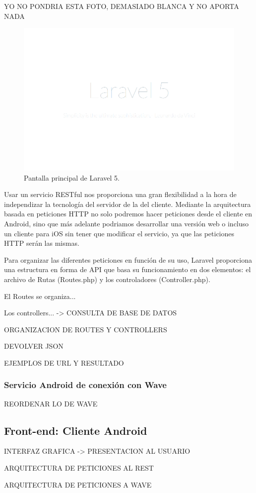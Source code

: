 YO NO PONDRIA ESTA FOTO, DEMASIADO BLANCA Y NO APORTA NADA 

\begin{figure}[H]
\centering
\includegraphics[keepaspectratio, scale=0.30]{Media/Captures/laravel5.png}
\caption{Pantalla principal de Laravel 5.}
\label{fig:laravel5}
\end{figure}

Usar un servicio RESTful nos proporciona una gran flexibilidad a la hora de independizar la tecnología del servidor de la del cliente. Mediante la arquitectura basada en peticiones HTTP no solo podremos hacer peticiones desde el cliente en Android, sino que más adelante podriamos desarrollar una versión web o incluso un cliente para iOS sin tener que modificar el servicio, ya que las peticiones HTTP serán las mismas.

Para organizar las diferentes peticiones en función de su uso, Laravel proporciona una estructura en forma de API que basa su funcionamiento en dos elementos: el archivo de Rutas (Routes.php) y los controladores (Controller.php).

El Routes se organiza...

Los controllers... -> CONSULTA DE BASE DE DATOS

ORGANIZACION DE ROUTES Y CONTROLLERS

DEVOLVER JSON

EJEMPLOS DE URL Y RESULTADO

\subsubsection{Servicio Android de conexión con Wave}

REORDENAR LO DE WAVE

\subsection{Front-end: Cliente Android}

INTERFAZ GRAFICA -> PRESENTACION AL USUARIO

ARQUITECTURA DE PETICIONES AL REST

ARQUITECTURA DE PETICIONES A WAVE

